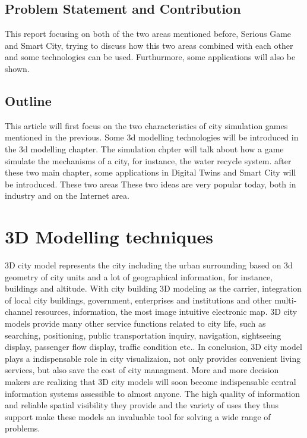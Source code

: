 \section{Problem Statement and Contribution}
This report focusing on both of the two areas mentioned before, Serious Game and Smart City, trying to discuss how this two areas combined with each other and some technologies can be used. Furthurmore, some applications will also be shown.

\section{Outline}
This article will first focus on the two characteristics of city simulation games mentioned in the previous. Some 3d modelling technologies will be introduced in the 3d modelling chapter. The simulation chpter will talk about how a game simulate the mechanisms of a city, for instance, the water recycle system. after these two main chapter, some applications in Digital Twins and Smart City will be introduced. These two areas These two ideas are very popular today, both in industry and on the Internet area.

\chapter{3D Modelling techniques}

3D city model represents the city including the urban surrounding based on 3d geometry of city units and a lot of geographical information, for instance, buildings and altitude.  With city building 3D modeling as the carrier, integration of local city buildings, government, enterprises and institutions and other multi-channel resources, information, the most image intuitive electronic map. 3D city models provide many other service functions related to city life, such as searching, positioning,  public transportation inquiry, navigation, sightseeing display, passenger flow display, traffic condition etc.. In conclusion, 3D city model plays a indispensable role in city visualizaion, not only provides convenient living services, but also save the cost of city managment. More and more decision makers are realizing that 3D city models will soon become indispensable central information systems assessible to almost anyone. The high quality of information and reliable spatial visibility they provide and the variety of uses they thus support make these models an invaluable tool for solving a wide range of problems.

